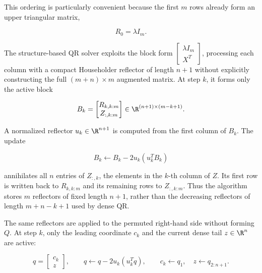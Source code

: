 \noindent This ordering is particularly convenient because the first $m$ rows already form an upper triangular matrix,

\begin{equation}
    R_0=\lambda I_m.
\end{equation}

\noindent The structure-based QR solver exploits the block form \(\begin{bmatrix}\lambda I_m\\X^T\end{bmatrix}\), processing each column with a compact Householder reflector of length \(n+1\) without explicitly constructing the full \((m+n)\times m\) augmented matrix. At step $k$, it forms only the active block

\begin{equation}
\label{eq:structure_active_block}
    B_k=
    \begin{bmatrix}
        R_{k,k:m}\\
        Z_{:,k:m}
    \end{bmatrix}
    \in\R^{(n+1)\times(m-k+1)}.
\end{equation}

\noindent A normalized reflector $u_k\in\R^{n+1}$ is computed from the first
column of $B_k$. The update

\begin{equation}
    B_k\leftarrow B_k-2u_k(u_k^T B_k)
\end{equation}

\noindent annihilates all $n$ entries of $Z_{:,k}$, the elements in the $k$-th column of $Z$. Its first row is written back to $R_{k,k:m}$ and its remaining rows to $Z_{:,k:m}$. Thus the
algorithm stores $m$ reflectors of fixed length $n+1$, rather than the
decreasing reflectors of length $m+n-k+1$ used by dense QR.

\noindent The same reflectors are applied to the permuted right-hand side without
forming $Q$. At step $k$, only the leading coordinate $c_k$ and the current
dense tail $z\in\R^n$ are active:

\begin{equation}
\label{eq:structure_rhs_update}
    q=\begin{bmatrix}c_k\\z\end{bmatrix},
    \qquad
    q\leftarrow q-2u_k(u_k^T q),
    \qquad
    c_k\leftarrow q_1,
    \quad z\leftarrow q_{2:n+1}.
\end{equation}

